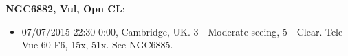 {\bf NGC6882, Vul, Opn CL}:
\begin{itemize}
\item 07/07/2015 22:30-0:00, Cambridge, UK. 3 - Moderate seeing, 5 - Clear. Tele Vue 60 F6, 15x, 51x. See NGC6885.
\end{itemize}
